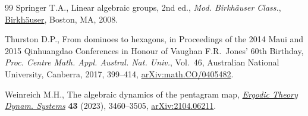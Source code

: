 \documentclass[10pt,a4paper]{amsart}
\numberwithin{equation}{section}
\begin{document}
\begin{thebibliography}{99}
Springer T.A., Linear algebraic groups, 2nd ed., \textit{Mod. Birkh\"auser Class.},
 \href{https://doi.org/10.1007/978-0-8176-4840-4}{Birkh\"auser}, Boston, MA,
 2008.

Thurston D.P., From dominoes to hexagons, in Proceedings of the 2014 {M}aui and
 2015 {Q}inhuangdao Conferences in Honour of {V}aughan {F}.{R}.~{J}ones' 60th
 Birthday, \textit{Proc. Centre Math. Appl. Austral. Nat. Univ.}, Vol.~46,
 Australian National University, Canberra, 2017, 399--414,
 \href{http://arxiv.org/abs/math.CO/0405482}{arXiv:math.CO/0405482}.

Weinreich M.H., The algebraic dynamics of the pentagram map,
 \href{https://doi.org/10.1017/etds.2022.82}{\textit{Ergodic Theory Dynam.
 Systems}} \textbf{43} (2023), 3460--3505,
 \href{http://arxiv.org/abs/2104.06211}{arXiv:2104.06211}.

\end{thebibliography}
\end{document}

